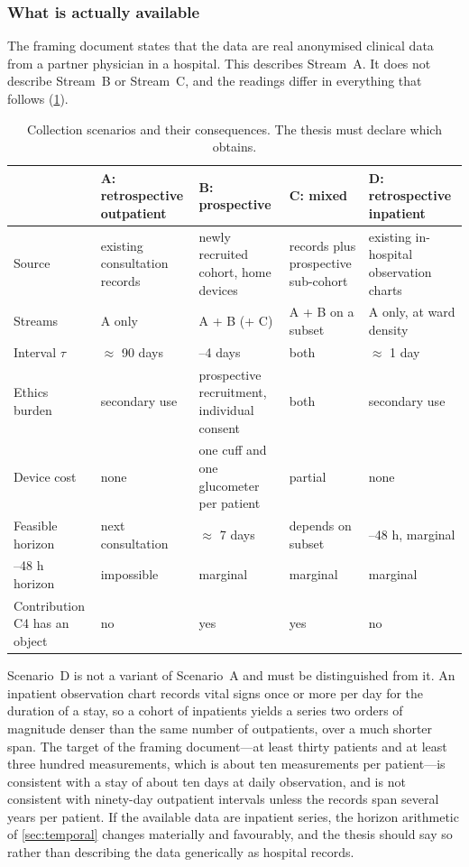 \documentclass[12pt,a4paper,oneside]{report}
\begin{document}
\subsubsection{What is actually available}\label{sec:scenarios}

The framing document states that the data are real anonymised clinical data from a partner physician in a hospital. This describes Stream~A. It does not describe Stream~B or Stream~C, and the readings differ in everything that follows (\cref{tab:scenarios}).

\begin{table}[htbp]
\centering\footnotesize
\caption{Collection scenarios and their consequences. The thesis must declare which obtains.}\label{tab:scenarios}
\begin{tabularx}{\textwidth}{@{}>{\raggedright\arraybackslash}p{2.3cm} >{\raggedright\arraybackslash}X >{\raggedright\arraybackslash}X >{\raggedright\arraybackslash}X >{\raggedright\arraybackslash}X@{}}
\toprule
 & \textbf{A: retrospective outpatient} & \textbf{B: prospective} & \textbf{C: mixed} & \textbf{D: retrospective inpatient} \\
\midrule
Source & existing consultation records & newly recruited cohort, home devices & records plus prospective sub-cohort & existing in-hospital observation charts \\
Streams & A only & A + B (+ C) & A + B on a subset & A only, at ward density \\
Interval $\tau$ & $\approx$ 90 days & 3--4 days & both & $\approx$ 1 day \\
Ethics burden & secondary use & prospective recruitment, individual consent & both & secondary use \\
Device cost & none & one cuff and one glucometer per patient & partial & none \\
Feasible horizon & next consultation & $\approx$ 7 days & depends on subset & 24--48 h, marginal \\
24--48 h horizon & impossible & marginal & marginal & marginal \\
Contribution C4 has an object & no & yes & yes & no \\
\bottomrule
\end{tabularx}
\end{table}

Scenario~D is not a variant of Scenario~A and must be distinguished from it. An inpatient observation chart records vital signs once or more per day for the duration of a stay, so a cohort of inpatients yields a series two orders of magnitude denser than the same number of outpatients, over a much shorter span. The target of the framing document---at least thirty patients and at least three hundred measurements, which is about ten measurements per patient---is consistent with a stay of about ten days at daily observation, and is not consistent with ninety-day outpatient intervals unless the records span several years per patient. If the available data are inpatient series, the horizon arithmetic of \cref{sec:temporal} changes materially and favourably, and the thesis should say so rather than describing the data generically as hospital records.
\end{document}

